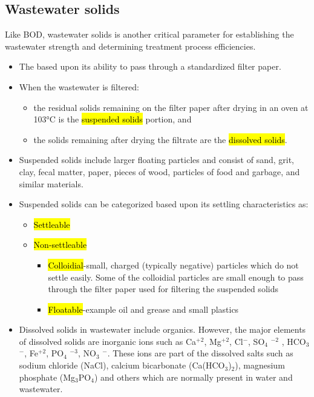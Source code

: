 \subsection{Wastewater solids}
		Like BOD, wastewater solids is another critical parameter for establishing the wastewater strength and determining treatment process efficiencies. 
		\begin{itemize}
			\item The  based upon its ability to pass through a standardized filter paper.
			\item When the wastewater is filtered:
			      \begin{itemize}
			      	\item the residual solids remaining on the filter paper after drying in an oven at 103\si{\degree}C is the \hl{suspended solids} portion, and 
			      	\item the solids remaining after drying the filtrate are the \hl{dissolved solids}.
			      \end{itemize}
			\item Suspended solids include larger floating particles and consist of sand, grit, clay, fecal matter, paper, pieces of wood, particles of food and garbage, and similar materials.
			\item Suspended solids can be categorized based upon its settling characteristics as:
			      \begin{itemize}
			      	\item \hl{Settleable}
			      	\item \hl{Non-settleable}
			      	      \begin{itemize}
			      	      	\item \hl{Colloidial}-small, charged (typically negative) particles which do not settle easily.  Some of the colloidial particles are small enough to pass through the filter paper used for filtering the suspended solids
			      	      	\item \hl{Floatable}-example oil and grease and small plastics
			      	      \end{itemize}
			      \end{itemize}
			\item Dissolved solids in wastewater include organics.  However, the major elements of dissolved solids are inorganic ions such as Ca$^{+2}$, Mg$^{+2}$, Cl$^-$, SO$_4$ $^{-2}$ , HCO$_3$ $^-$, Fe$^{+2}$, PO$_4$ $^{-3}$, NO$_3$ $^-$.  These ions are part of the dissolved salts such as sodium chloride (NaCl), calcium bicarbonate (Ca(HCO$_3$)$_2$), magnesium phosphate (Mg$_3$PO$_4$) and others which are normally present in water and wastewater. 

\end{itemize}
